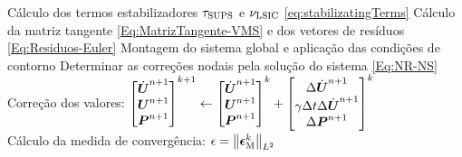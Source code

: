 \begin{algorithm}[h!]
{{{    Cálculo dos termos estabilizadores $\tau_{\mathrm{SUPS}}$ e $\nu_{\mathrm{LSIC}}$ \eqref{eq:stabilizatingTerms}\;
    Cálculo da matriz tangente \eqref{Eq:MatrizTangente-VMS} e dos vetores de resíduos \eqref{Eq:Residuos-Euler}\;
    }
    Montagem do sistema global e aplicação das condições de contorno\;
    Determinar as correções nodais pela solução do sistema \eqref{Eq:NR-NS}\;
    Correção dos valores:\newline
    $
        \begin{bmatrix}
            \dot{\boldsymbol{U}}^{n+1} \\\boldsymbol{U}^{n+1}\\\boldsymbol{P}^{n+1}
        \end{bmatrix}^{k+1}\gets
        \begin{bmatrix}
            \dot{\boldsymbol{U}}^{n+1} \\\boldsymbol{U}^{n+1}\\\boldsymbol{P}^{n+1}
        \end{bmatrix}^{k}+
        \begin{bmatrix}
            \Delta\dot{\boldsymbol{U}}^{n+1} \\\gamma\Delta t\Delta\dot{\boldsymbol{U}}^{n+1}\\\Delta\boldsymbol{P}^{n+1}
        \end{bmatrix}^{k}
    $\\
    Cálculo da medida de convergência: $\epsilon=\left\lVert{\boldsymbol{\epsilon}_\mathrm{M}^k}\right\lVert_{L^2}$
    }
    }
\end{algorithm}
